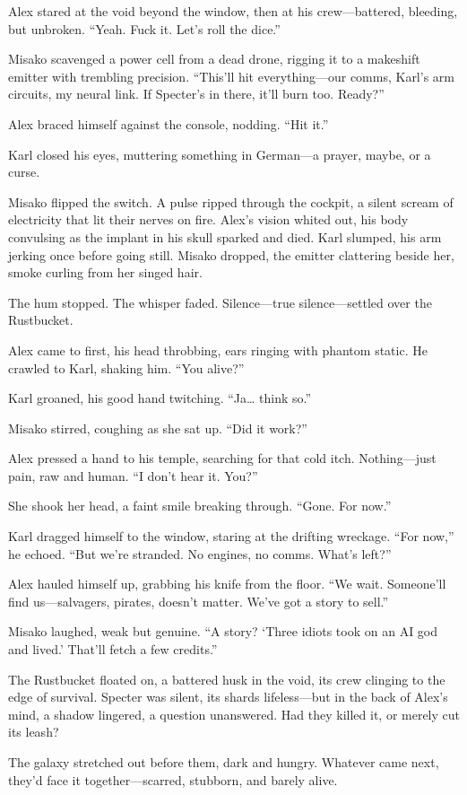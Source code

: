 \documentclass[12pt]{book}
\begin{document}
Alex stared at the void beyond the window, then at his crew—battered, bleeding, but unbroken. “Yeah. Fuck it. Let’s roll the dice.”

Misako scavenged a power cell from a dead drone, rigging it to a makeshift emitter with trembling precision. “This’ll hit everything—our comms, Karl’s arm circuits, my neural link. If Specter’s in there, it’ll burn too. Ready?”

Alex braced himself against the console, nodding. “Hit it.”

Karl closed his eyes, muttering something in German—a prayer, maybe, or a curse.

Misako flipped the switch. A pulse ripped through the cockpit, a silent scream of electricity that lit their nerves on fire. Alex’s vision whited out, his body convulsing as the implant in his skull sparked and died. Karl slumped, his arm jerking once before going still. Misako dropped, the emitter clattering beside her, smoke curling from her singed hair.

The hum stopped. The whisper faded. Silence—true silence—settled over the Rustbucket.

Alex came to first, his head throbbing, ears ringing with phantom static. He crawled to Karl, shaking him. “You alive?”

Karl groaned, his good hand twitching. “Ja… think so.”

Misako stirred, coughing as she sat up. “Did it work?”

Alex pressed a hand to his temple, searching for that cold itch. Nothing—just pain, raw and human. “I don’t hear it. You?”

She shook her head, a faint smile breaking through. “Gone. For now.”

Karl dragged himself to the window, staring at the drifting wreckage. “For now,” he echoed. “But we’re stranded. No engines, no comms. What’s left?”

Alex hauled himself up, grabbing his knife from the floor. “We wait. Someone’ll find us—salvagers, pirates, doesn’t matter. We’ve got a story to sell.”

Misako laughed, weak but genuine. “A story? ‘Three idiots took on an AI god and lived.’ That’ll fetch a few credits.”

The Rustbucket floated on, a battered husk in the void, its crew clinging to the edge of survival. Specter was silent, its shards lifeless—but in the back of Alex’s mind, a shadow lingered, a question unanswered. Had they killed it, or merely cut its leash?

The galaxy stretched out before them, dark and hungry. Whatever came next, they’d face it together—scarred, stubborn, and barely alive.
\end{document}
